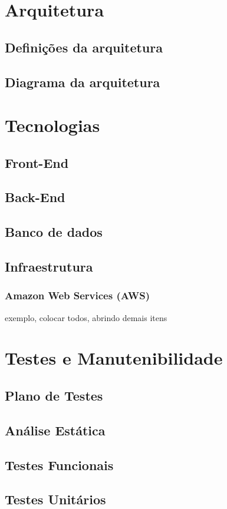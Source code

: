 \documentclass[
12pt,				%
openany,			%
oneside,			%
a4paper,			%
english,			%
french,				%
spanish,			%
brazil				%
]{abntex2}
\begin{document}
	\section{Arquitetura}
	\subsection{Definições da arquitetura}
	\subsection{Diagrama da arquitetura}
	\section{Tecnologias}
	\subsection{Front-End}
	\subsection{Back-End}
	\subsection{Banco de dados}
	\subsection{Infraestrutura}
	\subsubsection{Amazon Web Services (AWS)}
	exemplo, colocar todos, abrindo demais itens
	\section{Testes e Manutenibilidade}
	\subsection{Plano de Testes}
	\subsection{Análise Estática}
	\subsection{Testes Funcionais}
	\subsection{Testes Unitários}
\end{document}
